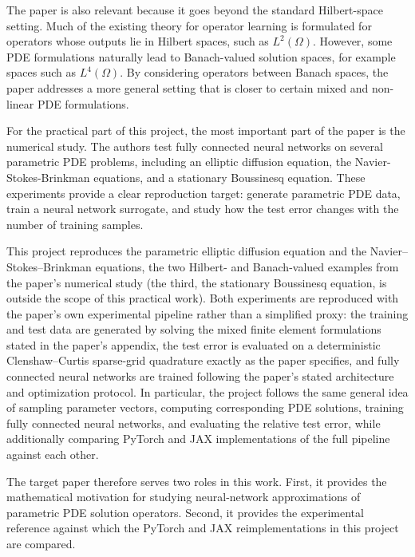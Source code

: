 The paper is also relevant because it goes beyond the standard Hilbert-space setting. Much of the existing theory for operator learning is formulated for operators whose outputs lie in Hilbert spaces, such as $L^2(\Omega)$. However, some PDE formulations naturally lead to Banach-valued solution spaces, for example spaces such as $L^4(\Omega)$. By considering operators between Banach spaces, the paper addresses a more general setting that is closer to certain mixed and non-linear PDE formulations.

For the practical part of this project, the most important part of the paper is the numerical study. The authors test fully connected neural networks on several parametric PDE problems, including an elliptic diffusion equation, the Navier-Stokes-Brinkman equations, and a stationary Boussinesq equation. These experiments provide a clear reproduction target: generate parametric PDE data, train a neural network surrogate, and study how the test error changes with the number of training samples.

This project reproduces the parametric elliptic diffusion equation and the
Navier--Stokes--Brinkman equations, the two Hilbert- and Banach-valued
examples from the paper's numerical study (the third, the stationary
Boussinesq equation, is outside the scope of this practical work). Both
experiments are reproduced with the paper's own experimental pipeline
rather than a simplified proxy: the training and test data are generated by
solving the mixed finite element formulations stated in the paper's
appendix, the test error is evaluated on a deterministic Clenshaw--Curtis
sparse-grid quadrature exactly as the paper specifies, and fully connected
neural networks are trained following the paper's stated architecture and
optimization protocol. In particular, the project follows the same general
idea of sampling parameter vectors, computing corresponding PDE solutions,
training fully connected neural networks, and evaluating the relative test
error, while additionally comparing PyTorch and JAX implementations of the
full pipeline against each other.

The target paper therefore serves two roles in this work. First, it provides the mathematical motivation for studying neural-network approximations of parametric PDE solution operators. Second, it provides the experimental reference against which the PyTorch and JAX reimplementations in this project are compared.
